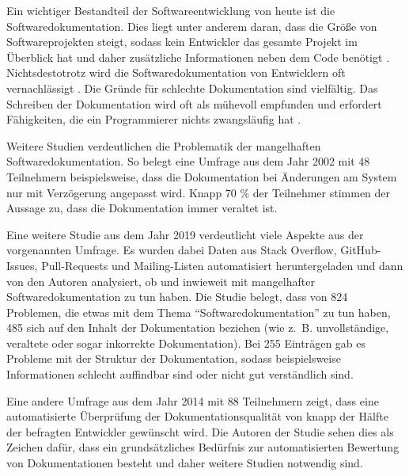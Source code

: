 \label{sec:introduction}

Ein wichtiger Bestandteil der Softwareentwicklung von heute ist die Softwaredokumentation. Dies liegt unter anderem daran, dass die Größe von Softwareprojekten steigt, sodass kein Entwickler das gesamte Projekt im Überblick hat und daher zusätzliche Informationen neben dem Code benötigt \cite[S.~1]{StaticAnalysis:AnIntroduction:TheFundamentalChallengeofSoftwareEngineeringisOneofComplexity.}. Nichtsdestotrotz wird die Softwaredokumentation von Entwicklern oft vernachlässigt \cite[S.~83]{Qualityanalysisofsourcecodecomments}.  Die Gründe für schlechte Dokumentation sind vielfältig. Das Schreiben der Dokumentation wird oft als mühevoll empfunden und erfordert Fähigkeiten, die ein Programmierer nichts zwangsläufig hat \cite[S.~70]{AutomaticQualityAssessmentofSourceCodeComments:TheJavadocMiner} \cite[S.~593]{Softwareengineeringandsoftwaredocumentation:aunifiedlongcourse}.  

Weitere Studien verdeutlichen die Problematik der mangelhaften Softwaredokumentation. So belegt eine Umfrage aus dem Jahr 2002 mit 48 Teilnehmern  beispielsweise, dass die Dokumentation  bei Änderungen am System  nur mit Verzögerung angepasst wird. Knapp 70 \% der Teilnehmer stimmen der Aussage zu, dass die Dokumentation immer veraltet ist.   \cite[S.~28-29]{TheRelevanceofSoftwareDocumentationToolsandTechnologies:ASurvey}

Eine weitere Studie  \cite[S.1199-1208]{SoftwareDocumentationIssuesUnveiled} aus dem Jahr 2019 verdeutlicht viele Aspekte aus der vorgenannten Umfrage. Es wurden dabei Daten aus Stack Overflow, GitHub-Issues, Pull-Requests und Mailing-Listen automatisiert heruntergeladen und dann von den Autoren analysiert, ob und inwieweit mit mangelhafter Softwaredokumentation zu tun haben.  Die Studie belegt, dass von 824 Problemen, die etwas mit dem Thema \enquote{Softwaredokumentation} zu tun haben, 485 sich auf den Inhalt der Dokumentation beziehen (wie z.~B. unvollständige, veraltete oder sogar inkorrekte Dokumentation). Bei 255 Einträgen gab es Probleme mit der Struktur der Dokumentation, sodass beispielsweise Informationen schlecht auffindbar sind oder nicht gut verständlich sind.


Eine andere Umfrage aus dem Jahr 2014 mit 88 Teilnehmern zeigt, dass eine automatisierte Überprüfung der Dokumentationsqualität von knapp der Hälfte der befragten Entwickler gewünscht wird. Die Autoren der Studie sehen dies als Zeichen dafür, dass ein grundsätzliches Bedürfnis zur automatisierten Bewertung von Dokumentationen besteht und daher weitere Studien notwendig sind. \cite[S.~340]{TheValueofSoftwareDocumentationQuality}

